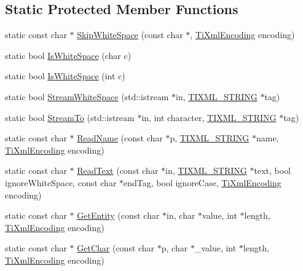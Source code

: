 \subsection*{Static Protected Member Functions}
\begin{DoxyCompactItemize}
\item 
static const char $\ast$ \hyperlink{class_ti_xml_base_ac0c3d66d8a9e6996a1fa016275e16875}{Skip\+White\+Space} (const char $\ast$, \hyperlink{tinyxml_8h_a88d51847a13ee0f4b4d320d03d2c4d96}{Ti\+Xml\+Encoding} encoding)
\item 
static bool \hyperlink{class_ti_xml_base_af56296d561c0bab4bc8e198cdcf5c48e}{Is\+White\+Space} (char c)
\item 
static bool \hyperlink{class_ti_xml_base_a3de391ea9f4c4a8aa10d04480b048795}{Is\+White\+Space} (int c)
\item 
static bool \hyperlink{class_ti_xml_base_aafe51421ca2f618d250a0541e8d61a4e}{Stream\+White\+Space} (std\+::istream $\ast$in, \hyperlink{tinyxml_8h_a92bada05fd84d9a0c9a5bbe53de26887}{T\+I\+X\+M\+L\+\_\+\+S\+T\+R\+I\+NG} $\ast$tag)
\item 
static bool \hyperlink{class_ti_xml_base_aac761023c11f3216de865f0a4b2b137b}{Stream\+To} (std\+::istream $\ast$in, int character, \hyperlink{tinyxml_8h_a92bada05fd84d9a0c9a5bbe53de26887}{T\+I\+X\+M\+L\+\_\+\+S\+T\+R\+I\+NG} $\ast$tag)
\item 
static const char $\ast$ \hyperlink{class_ti_xml_base_a1c21a6ab5f7b503acd91f35f183734b3}{Read\+Name} (const char $\ast$p, \hyperlink{tinyxml_8h_a92bada05fd84d9a0c9a5bbe53de26887}{T\+I\+X\+M\+L\+\_\+\+S\+T\+R\+I\+NG} $\ast$name, \hyperlink{tinyxml_8h_a88d51847a13ee0f4b4d320d03d2c4d96}{Ti\+Xml\+Encoding} encoding)
\item 
static const char $\ast$ \hyperlink{class_ti_xml_base_aa646c74921aa33156968b802bbf5566e}{Read\+Text} (const char $\ast$in, \hyperlink{tinyxml_8h_a92bada05fd84d9a0c9a5bbe53de26887}{T\+I\+X\+M\+L\+\_\+\+S\+T\+R\+I\+NG} $\ast$text, bool ignore\+White\+Space, const char $\ast$end\+Tag, bool ignore\+Case, \hyperlink{tinyxml_8h_a88d51847a13ee0f4b4d320d03d2c4d96}{Ti\+Xml\+Encoding} encoding)
\item 
static const char $\ast$ \hyperlink{class_ti_xml_base_ac5c08bf3deffcda0bf8ce2958372b584}{Get\+Entity} (const char $\ast$in, char $\ast$value, int $\ast$length, \hyperlink{tinyxml_8h_a88d51847a13ee0f4b4d320d03d2c4d96}{Ti\+Xml\+Encoding} encoding)
\item 
static const char $\ast$ \hyperlink{class_ti_xml_base_a5b0fde72d6f662ae1fd6303195d2159b}{Get\+Char} (const char $\ast$p, char $\ast$\+\_\+value, int $\ast$length, \hyperlink{tinyxml_8h_a88d51847a13ee0f4b4d320d03d2c4d96}{Ti\+Xml\+Encoding} encoding)

\end{DoxyCompactItemize}
